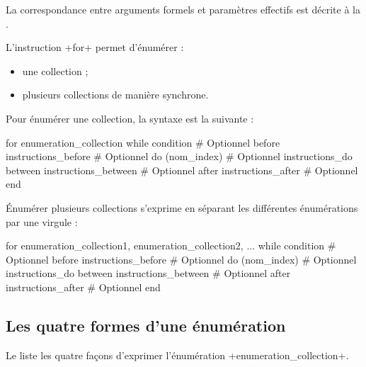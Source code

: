 La correspondance entre arguments formels et paramètres effectifs est décrite à la .





L'instruction \ggs+for+ permet d'énumérer :
\begin{itemize}
  \item une collection ;
  \item plusieurs collections de manière synchrone.
\end{itemize}

Pour énumérer une collection, la syntaxe est la suivante :

\begin{galgas}
for enumeration_collection
while condition # Optionnel
before instructions_before  # Optionnel
do 
  (nom_index) # Optionnel
  instructions_do
between instructions_between  # Optionnel
after instructions_after  # Optionnel
end
\end{galgas}


Énumérer plusieurs collections s'exprime en séparant les différentes énumérations par une virgule :
\begin{galgas}
for enumeration_collection1, enumeration_collection2, ...
while condition # Optionnel
before instructions_before  # Optionnel
do
  (nom_index) # Optionnel
  instructions_do
between instructions_between  # Optionnel
after instructions_after  # Optionnel
end
\end{galgas}


\subsection{Les quatre formes d'une énumération}

Le  liste les quatre façons d'exprimer l'énumération \ggs+enumeration_collection+.


